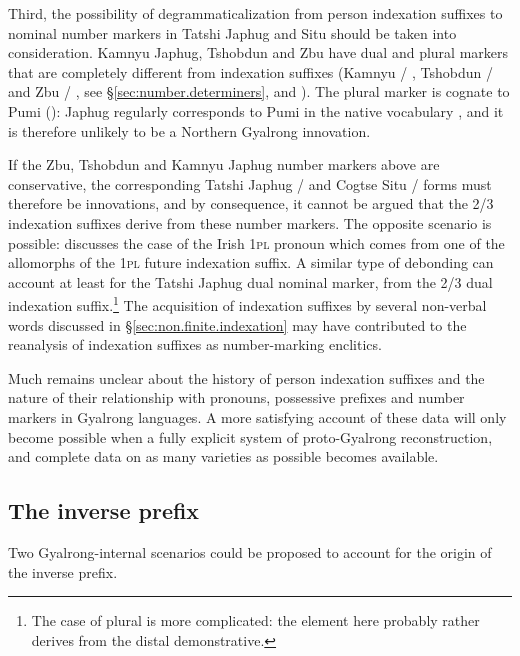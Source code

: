 Third, the possibility of degrammaticalization from person indexation suffixes to nominal number markers in Tatshi Japhug and Situ should be taken into consideration. Kamnyu Japhug, Tshobdun and Zbu have dual and plural markers that are completely different from indexation suffixes (Kamnyu  / , Tshobdun  / and Zbu  / , see §\ref{sec:number.determiners}, \citealt{jackson98morphology} and \citealt{gong18these}). The plural marker is cognate to Pumi  (\citealt[135]{daudey14grammar}): Japhug  regularly corresponds to Pumi  in the native vocabulary \citep{jacques17num}, and it is therefore unlikely to be a Northern Gyalrong innovation. 

If the Zbu, Tshobdun and Kamnyu Japhug number markers above are conservative,  the corresponding Tatshi Japhug  /  and Cogtse Situ  /  forms must therefore be innovations, and by consequence, it cannot be argued that the 2/3 indexation suffixes derive from these number markers. The opposite scenario is possible: \citet[204--206]{norde09degrammaticalization} discusses the case of the Irish \textsc{1pl} pronoun  which comes from one of the allomorphs of the  \textsc{1pl} future indexation suffix. A similar type of debonding can account at least for the Tatshi Japhug dual  nominal marker, from the 2/3 dual  indexation suffix.\footnote{The case of plural  is more complicated: the   element here probably rather derives from the distal demonstrative. } The acquisition of indexation suffixes by several non-verbal words discussed in §\ref{sec:non.finite.indexation} may have contributed to the reanalysis of indexation suffixes as number-marking enclitics.

Much remains unclear about the history of person indexation suffixes and the nature of their relationship with pronouns, possessive prefixes and number markers in Gyalrong languages. A more satisfying account of these data will only become possible when a fully explicit system of proto-Gyalrong reconstruction, and complete data on as many varieties as possible becomes available.

\subsection{The inverse prefix} \label{sec:inverse.history}
Two Gyalrong-internal scenarios could be proposed to account for the origin of the inverse prefix. 

